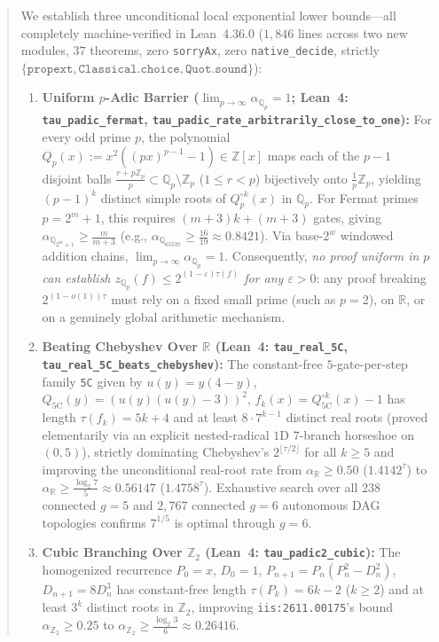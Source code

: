 \documentclass[11pt]{article}
\newcommand{\Z}{\mathbb{Z}}
\newcommand{\Q}{\mathbb{Q}}
\newcommand{\R}{\mathbb{R}}
\newcommand{\code}[1]{\texttt{#1}}
\begin{document}
\begin{abstract}
We establish three unconditional local exponential lower bounds---all completely machine-verified in Lean~4.36.0 ($1{,}846$ lines across two new modules, $37$ theorems, zero \code{sorryAx}, zero \code{native\_decide}, strictly $\{\code{propext}, \code{Classical.choice}, \code{Quot.sound}\}$):
\begin{enumerate}[label=(\arabic*),leftmargin=1.8em]
  \item \textbf{Uniform $p$-Adic Barrier ($\lim_{p \to \infty} \alpha_{\Q_p} = 1$; Lean~4: \code{tau\_padic\_fermat}, \code{tau\_padic\_rate\_}\allowbreak\code{arbitrarily\_close\_to\_one}):} For every odd prime $p$, the polynomial $Q_p(x) := x^2((px)^{p-1} - 1) \in \Z[x]$ maps each of the $p - 1$ disjoint balls $\frac{r + p\Z_p}{p} \subset \Q_p \setminus \Z_p$ ($1 \le r < p$) bijectively onto $\frac{1}{p}\Z_p$, yielding $(p - 1)^k$ distinct simple roots of $Q_p^{\circ k}(x)$ in $\Q_p$. For Fermat primes $p = 2^m + 1$, this requires $(m + 3)k + (m + 3)$ gates, giving $\alpha_{\Q_{2^m+1}} \ge \frac{m}{m+3}$ (e.g., $\alpha_{\Q_{65537}} \ge \frac{16}{19} \approx 0.8421$). Via base-$2^w$ windowed addition chains, $\lim_{p \to \infty} \alpha_{\Q_p} = 1$. Consequently, \emph{no proof uniform in $p$ can establish $z_{\Q_p}(f) \le 2^{(1-\varepsilon)\tau(f)}$ for any $\varepsilon > 0$}: any proof breaking $2^{(1-o(1))\tau}$ must rely on a fixed small prime (such as $p = 2$), on $\R$, or on a genuinely global arithmetic mechanism.
  \item \textbf{Beating Chebyshev Over $\R$ (Lean~4: \code{tau\_real\_5C}, \code{tau\_real\_5C\_beats\_chebyshev}):} The constant-free $5$-gate-per-step family \code{5C} given by $u(y) = y(4-y)$, $Q_{\mathrm{5C}}(y) = (u(y)(u(y)-3))^2$, $f_k(x) = Q_{\mathrm{5C}}^{\circ k}(x) - 1$ has length $\tau(f_k) = 5k + 4$ and at least $8 \cdot 7^{k-1}$ distinct real roots (proved elementarily via an explicit nested-radical $1$D $7$-branch horseshoe on $(0, 5)$), strictly dominating Chebyshev's $2^{\lfloor \tau/2 \rfloor}$ for all $k \ge 5$ and improving the unconditional real-root rate from $\alpha_{\R} \ge 0.50$ ($1.4142^\tau$) to $\alpha_{\R} \ge \frac{\log_2 7}{5} \approx 0.56147$ ($1.4758^\tau$). Exhaustive search over all $238$ connected $g = 5$ and $2{,}767$ connected $g = 6$ autonomous DAG topologies confirms $7^{1/5}$ is optimal through $g = 6$.
  \item \textbf{Cubic Branching Over $\Z_2$ (Lean~4: \code{tau\_padic2\_cubic}):} The homogenized recurrence $P_0 = x$, $D_0 = 1$, $P_{n+1} = P_n(P_n^2 - D_n^2)$, $D_{n+1} = 8 D_n^3$ has constant-free length $\tau(P_k) = 6k - 2$ ($k \ge 2$) and at least $3^k$ distinct roots in $\Z_2$, improving \code{iis:2611.00175}'s bound $\alpha_{\Z_2} \ge 0.25$ to $\alpha_{\Z_2} \ge \frac{\log_2 3}{6} \approx 0.26416$.

\end{enumerate}
\end{abstract}
\end{document}
